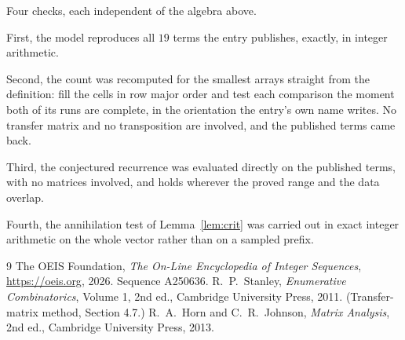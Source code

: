 \documentclass[11pt,a4paper]{article}
\theoremstyle{plain}
\theoremstyle{definition}
\begin{document}
Four checks, each independent of the algebra above.

First, the model reproduces all $19$ terms the entry publishes, exactly, in integer
arithmetic.

Second, the count was recomputed for the smallest arrays straight from the definition: fill the
cells in row major order and test each comparison the moment both of its runs are complete,
in the orientation the entry's own name writes. No transfer matrix and no transposition are
involved, and the published terms came back.

Third, the conjectured recurrence was evaluated directly on the published terms, with no
matrices involved, and holds wherever the proved range and the data overlap.

Fourth, the annihilation test of Lemma~\ref{lem:crit} was carried out in exact integer
arithmetic on the whole vector rather than on a sampled prefix.

\begin{thebibliography}{9}
 The OEIS Foundation, \emph{The On-Line Encyclopedia of Integer
Sequences}, \url{https://oeis.org}, 2026. Sequence A250636.
 R.~P.~Stanley, \emph{Enumerative Combinatorics}, Volume 1, 2nd ed.,
Cambridge University Press, 2011. (Transfer-matrix method, Section 4.7.)
 R.~A.~Horn and C.~R.~Johnson, \emph{Matrix Analysis}, 2nd ed., Cambridge
University Press, 2013.
\end{thebibliography}
\end{document}

